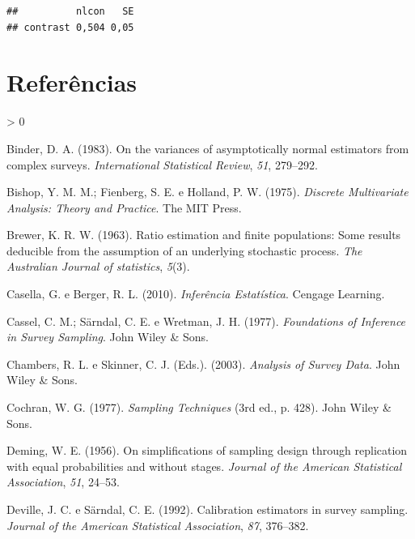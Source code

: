 \documentclass[
  12pt,
  brazilian,
]{book}
\newlength{\cslhangindent}
\newenvironment{CSLReferences}[2] %
 {%
  \setlength{\parindent}{0pt}
  \ifodd #1 \everypar{\setlength{\hangindent}{\cslhangindent}}\ignorespaces\fi
  \ifnum #2 > 0
  \setlength{\parskip}{#2\baselineskip}
  \fi
 }%
 {}
\theoremstyle{definition}
\theoremstyle{definition}
\theoremstyle{definition}
\theoremstyle{definition}
\theoremstyle{remark}
\begin{document}
\begin{verbatim}
##          nlcon   SE
## contrast 0,504 0,05
\end{verbatim}

\hypertarget{referuxeancias}{%
\chapter*{Referências}\label{referuxeancias}}

\hypertarget{refs}{}
\begin{CSLReferences}{1}{0}
\leavevmode\hypertarget{ref-binder83}{}%
Binder, D. A. (1983). On the variances of asymptotically normal estimators from complex surveys. \emph{International Statistical Review}, \emph{51}, 279--292.

\leavevmode\hypertarget{ref-Bishop1975}{}%
Bishop, Y. M. M.; Fienberg, S. E. e Holland, P. W. (1975). \emph{Discrete Multivariate Analysis: Theory and Practice}. The MIT Press.

\leavevmode\hypertarget{ref-Brewer1963}{}%
Brewer, K. R. W. (1963). {Ratio estimation and finite populations: Some results deducible from the assumption of an underlying stochastic process}. \emph{The Australian Journal of statistics}, \emph{5}(3).

\leavevmode\hypertarget{ref-Casella2010}{}%
Casella, G. e Berger, R. L. (2010). \emph{Inferência Estatística}. Cengage Learning.

\leavevmode\hypertarget{ref-cassel1977}{}%
Cassel, C. M.; Särndal, C. E. e Wretman, J. H. (1977). \emph{Foundations of Inference in Survey Sampling}. John Wiley \& Sons.

\leavevmode\hypertarget{ref-CHSK2003}{}%
Chambers, R. L. e Skinner, C. J. (Eds.). (2003). \emph{Analysis of Survey Data}. John Wiley \& Sons.

\leavevmode\hypertarget{ref-Cochran1977}{}%
Cochran, W. G. (1977). \emph{{Sampling Techniques}} (3rd ed., p. 428). John Wiley {\&} Sons.

\leavevmode\hypertarget{ref-deming1956}{}%
Deming, W. E. (1956). On simplifications of sampling design through replication with equal probabilities and without stages. \emph{Journal of the American Statistical Association}, \emph{51}, 24--53.

\leavevmode\hypertarget{ref-Deville1992}{}%
Deville, J. C. e Särndal, C. E. (1992). {Calibration estimators in survey sampling}. \emph{Journal of the American Statistical Association}, \emph{87}, 376--382.


\end{CSLReferences}
\end{document}
